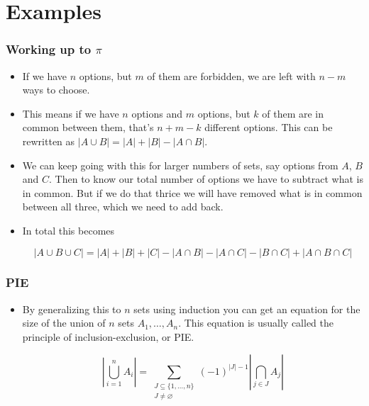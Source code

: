 \documentclass{beamer}
\newcommand\abs[1]{\left|#1\right|}
\begin{document}
\section*{Examples}

\begin{frame}[plain]
\frametitle{Working up to $\pi$}

\begin{itemize}

\item If we have $n$ options, but $m$ of them are forbidden, we are left with $n - m$ ways to choose.

\item This means if we have $n$ options and $m$ options, but $k$ of them are in common between them, that's $n + m - k$ different options. This can be rewritten as $\abs{A \cup B} = \abs{A} + \abs{B} - \abs{A \cap B}$.

\item We can keep going with this for larger numbers of sets, say options from $A$, $B$ and $C$. Then to know our total number of options we have to subtract what is in common. But if we do that thrice we will have removed what is in common between all three, which we need to add back.

\item In total this becomes
\begin{small}
\[\abs{A \cup B \cup C} = \abs{A} + \abs{B} + \abs{C} - \abs{A \cap B} - \abs{A \cap C} - \abs{B \cap C} + \abs{A \cap B \cap C}\]
\end{small}

\end{itemize}

\end{frame}

\begin{frame}[plain]
\frametitle{PIE}

\begin{itemize}

\item By generalizing this to $n$ sets using induction you can get an equation for the size of the union of $n$ sets $A_1, \dots, A_n$. This equation is usually called the principle of inclusion-exclusion, or PIE.

\[\abs{\bigcup_{i = 1}^n A_i} = \sum_{\substack{J \subseteq \{1,\dots,n\} \\ J \neq \varnothing}} (-1)^{\abs{J} - 1} \abs{\bigcap_{j \in J} A_j}\]

\end{itemize}

\end{frame}
\end{document}
